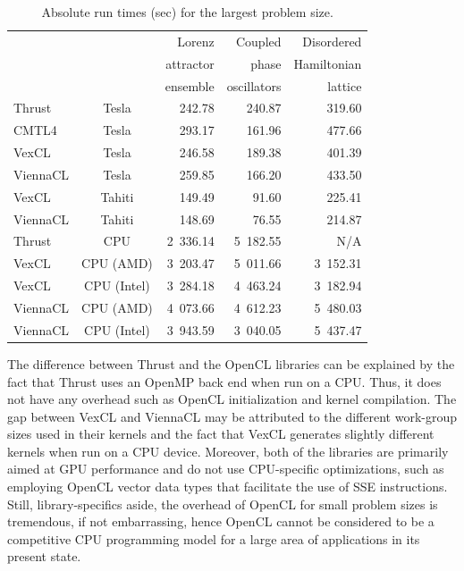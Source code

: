 \documentclass[final]{siamltex}
\begin{document}
\begin{table}
 \centering
    \caption{Absolute run times (sec) for the largest problem size.}
    \label{tab:abstimes}
    \begin{tabular}{|lc|rrr|}
        \hline
        & & Lorenz    & Coupled     & Disordered  \\
        & & attractor & phase       & Hamiltonian \\
        & & ensemble  & oscillators & lattice     \\
        \hline
        Thrust   &Tesla & 242.78 & 240.87 & 319.60 \\
        CMTL4    &Tesla & 293.17 & 161.96 & 477.66 \\
        VexCL    &Tesla & 246.58 & 189.38 & 401.39 \\
        ViennaCL &Tesla & 259.85 & 166.20 & 433.50 \\
        \hline
        VexCL    &Tahiti & 149.49 & 91.60 & 225.41 \\
        ViennaCL &Tahiti & 148.69 & 76.55 & 214.87 \\
        \hline
        Thrust   &CPU         & 2~336.14 & 5~182.55 & N/A \\
        VexCL    &CPU (AMD)   & 3~203.47 & 5~011.66 & 3~152.31 \\
        VexCL    &CPU (Intel) & 3~284.18 & 4~463.24 & 3~182.94 \\
        ViennaCL &CPU (AMD)   & 4~073.66 & 4~612.23 & 5~480.03 \\
        ViennaCL &CPU (Intel) & 3~943.59 & 3~040.05 & 5~437.47 \\
        \hline
    \end{tabular}
\end{table}


The difference between Thrust and the OpenCL libraries can be explained by the
fact that Thrust uses an OpenMP back end when run on a CPU. Thus, it does not
have any overhead such as OpenCL initialization and kernel compilation.  The
gap between VexCL and ViennaCL may be attributed to the different work-group
sizes used in their kernels and the fact that VexCL generates slightly
different kernels when run on a CPU device. Moreover, both of the libraries are
primarily aimed at GPU performance and do not use CPU-specific optimizations,
such as employing OpenCL vector data types that facilitate the use of SSE
instructions.  Still, library-specifics aside, the overhead of OpenCL for small problem sizes is
tremendous, if not embarrassing, hence OpenCL cannot be considered to be a
competitive CPU programming model for a large area of applications in its
present state.
\end{document}
